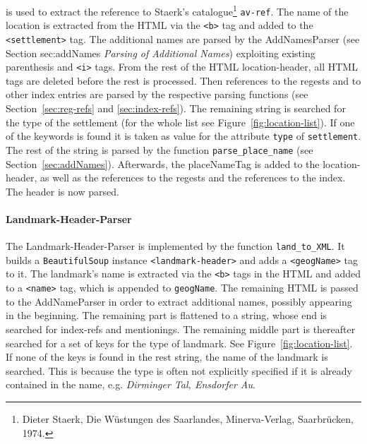 is used to extract the reference to Staerk's catalogue\footnote{Dieter Staerk, Die Wüstungen des Saarlandes, Minerva-Verlag, Saarbrücken, 1974.} \texttt{av-ref}. The name of the location is extracted from the HTML via the \texttt{<b>} tag and added to the \texttt{<settlement>} tag. The additional names are parsed by the AddNamesParser (see Section sec:addNames \textit{Parsing of Additional Names}) exploiting existing parenthesis and \texttt{<i>} tags. From the rest of the HTML location-header, all HTML tags are deleted before the rest is processed. Then references to the regests and to other index entries are parsed by the respective parsing functions (see Section~\ref{sec:reg-refs} and \ref{sec:index-refs}). The remaining string is searched for the type of the settlement (for the whole list see Figure~\ref{fig:location-list}). If one of the keywords is found it is taken as value for the attribute \texttt{type} of \texttt{settlement}. The rest of the string is parsed by the function \texttt{parse\_place\_name} (see Section~\ref{sec:addNames}). Afterwards, the placeNameTag is added to the location-header, as well as the references to the regests and the references to the index. The header is now parsed.

\paragraph{Landmark-Header-Parser}
The Landmark-Header-Parser is implemented by the function \texttt{land\_to\_XML}. It builds a \texttt{BeautifulSoup} instance \texttt{<landmark-header>} and adds a \texttt{<geogName>} tag to it. The landmark's name is extracted via the \texttt{<b>} tags in the HTML and added to a \texttt{<name>} tag, which is appended to \texttt{geogName}. The remaining HTML is passed to the AddNameParser in order to extract additional names, possibly appearing in the beginning. The remaining part is flattened to a string, whose end is searched for index-refs and mentionings. The remaining middle part is thereafter searched for a set of keys for the type of landmark. See Figure~\ref{fig:location-list}. If none of the keys is found in the rest string, the name of the landmark is searched. This is because the type is often not explicitly specified if it is already contained in the name, e.g. \textit{Dirminger Tal, Ensdorfer Au}.

